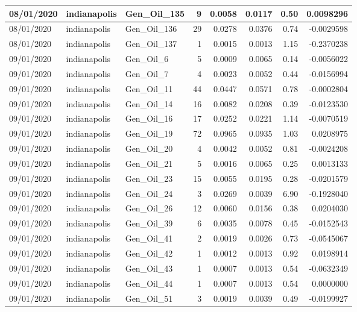 \documentclass[
  letterpaper,
  DIV=11,
  numbers=noendperiod]{scrartcl}
\begin{document}
\begin{tabular}{l|l|l|r|r|r|r|r}
\hline
08/01/2020 & indianapolis & Gen\_Oil\_135 & 9 & 0.0058 & 0.0117 & 0.50 & 0.0098296\\
\hline
08/01/2020 & indianapolis & Gen\_Oil\_136 & 29 & 0.0278 & 0.0376 & 0.74 & -0.0029598\\
\hline
08/01/2020 & indianapolis & Gen\_Oil\_137 & 1 & 0.0015 & 0.0013 & 1.15 & -0.2370238\\
\hline
09/01/2020 & indianapolis & Gen\_Oil\_6 & 5 & 0.0009 & 0.0065 & 0.14 & -0.0056022\\
\hline
09/01/2020 & indianapolis & Gen\_Oil\_7 & 4 & 0.0023 & 0.0052 & 0.44 & -0.0156994\\
\hline
09/01/2020 & indianapolis & Gen\_Oil\_11 & 44 & 0.0447 & 0.0571 & 0.78 & -0.0002804\\
\hline
09/01/2020 & indianapolis & Gen\_Oil\_14 & 16 & 0.0082 & 0.0208 & 0.39 & -0.0123530\\
\hline
09/01/2020 & indianapolis & Gen\_Oil\_16 & 17 & 0.0252 & 0.0221 & 1.14 & -0.0070519\\
\hline
09/01/2020 & indianapolis & Gen\_Oil\_19 & 72 & 0.0965 & 0.0935 & 1.03 & 0.0208975\\
\hline
09/01/2020 & indianapolis & Gen\_Oil\_20 & 4 & 0.0042 & 0.0052 & 0.81 & -0.0024208\\
\hline
09/01/2020 & indianapolis & Gen\_Oil\_21 & 5 & 0.0016 & 0.0065 & 0.25 & 0.0013133\\
\hline
09/01/2020 & indianapolis & Gen\_Oil\_23 & 15 & 0.0055 & 0.0195 & 0.28 & -0.0201579\\
\hline
09/01/2020 & indianapolis & Gen\_Oil\_24 & 3 & 0.0269 & 0.0039 & 6.90 & -0.1928040\\
\hline
09/01/2020 & indianapolis & Gen\_Oil\_26 & 12 & 0.0060 & 0.0156 & 0.38 & 0.0204030\\
\hline
09/01/2020 & indianapolis & Gen\_Oil\_39 & 6 & 0.0035 & 0.0078 & 0.45 & -0.0152543\\
\hline
09/01/2020 & indianapolis & Gen\_Oil\_41 & 2 & 0.0019 & 0.0026 & 0.73 & -0.0545067\\
\hline
09/01/2020 & indianapolis & Gen\_Oil\_42 & 1 & 0.0012 & 0.0013 & 0.92 & 0.0198914\\
\hline
09/01/2020 & indianapolis & Gen\_Oil\_43 & 1 & 0.0007 & 0.0013 & 0.54 & -0.0632349\\
\hline
09/01/2020 & indianapolis & Gen\_Oil\_44 & 1 & 0.0007 & 0.0013 & 0.54 & 0.0000000\\
\hline
09/01/2020 & indianapolis & Gen\_Oil\_51 & 3 & 0.0019 & 0.0039 & 0.49 & -0.0199927\\

\end{tabular}
\end{document}
